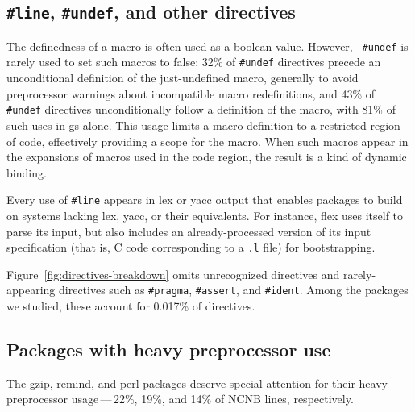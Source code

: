 \documentclass[10pt]{article}
\newcommand{\pkg}[1]{\textsf{#1}}
\begin{document}
\subsection{{\tt \#line}, {\tt \#undef}, and other directives}



The definedness of a macro is often used as a boolean value.  However, {\tt
\#undef} is rarely used to set such macros to false:   32\% of {\tt \#undef}
directives precede an unconditional definition of the just-undefined macro,
generally to avoid preprocessor warnings about incompatible macro
redefinitions, and 43\% of {\tt \#undef} directives unconditionally follow
a definition of the macro, with 81\% of such uses in \pkg{gs} alone.  This
usage limits a macro definition to a restricted region of code, effectively
providing a scope for the macro.  When such macros appear in the
expansions of macros used in the code region, the result is a kind of
dynamic binding.


Every use of {\tt \#line} appears in lex or yacc
output that enables packages to build on systems lacking lex, yacc, or
their equivalents.  For instance, \pkg{flex} uses itself to parse its
input, but also includes an already-processed version of its input
specification (that is, C code corresponding to a {\tt .l} file) for
bootstrapping.




Figure~\ref{fig:directives-breakdown} omits unrecognized directives and
rarely-appearing directives such as {\tt \#pragma}, {\tt \#assert}, and
{\tt \#ident}.  Among the packages we studied, these account for
0.017\% of directives.


\subsection{Packages with heavy preprocessor use}


The \pkg{gzip}, \pkg{remind}, and \pkg{perl} packages deserve
special attention for their heavy preprocessor usage\,---\,22\%, 19\%, and
14\% of NCNB lines, respectively.
\end{document}
